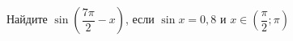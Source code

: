 \begin{ex}
	\begin{condition}
		Найдите \( \sin\left( \dfrac{7\pi}{2}-x \right) \), если \( \sin x = 0,8 \) и \( x\in\left( \dfrac{\pi}{2};\pi \right) \)
	\end{condition}
\end{ex}